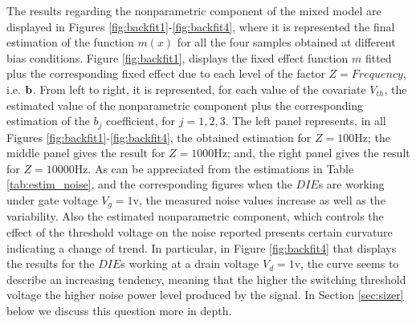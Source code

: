 \documentclass[sn-mathphys]{sn-jnl}%
\theoremstyle{thmstyleone}%
\theoremstyle{thmstyletwo}%
\theoremstyle{thmstylethree}%
\begin{document}
The results regarding the nonparametric component of the mixed model are displayed in Figures \ref{fig:backfit1}-\ref{fig:backfit4}, where it is represented the final estimation of the function $m(x)$ for all the four samples obtained at different bias conditions. Figure \ref{fig:backfit1}, displays the fixed effect function $m$  fitted plus the corresponding fixed effect due to each level of the factor $Z=Frequency$, i.e. ${\bf b}$. From left to right, it is represented, for each value of the covariate $V_{th}$, the estimated value of the nonparametric component plus the corresponding estimation of the $b_j$ coefficient, for $j=1,2, 3$. The left panel represents, in all Figures \ref{fig:backfit1}-\ref{fig:backfit4}, the obtained estimation for $Z=100$Hz; the middle panel gives the result for $Z=1000$Hz; and, the right panel gives the result for $Z=10000$Hz.  As can be appreciated from the estimations in Table \ref{tab:estim_noise}, and the corresponding figures when the $DIE$s are working under gate voltage $V_g=1$v, the measured noise values increase as well as the variability. Also the estimated nonparametric component, which controls the effect of the threshold voltage on the noise reported presents certain curvature indicating a change of trend. In particular, in Figure \ref{fig:backfit4} that displays the results for the $DIE$s working at a drain voltage $V_d=1$v, the curve seems to describe an increasing tendency, meaning that the higher the switching threshold voltage  the higher noise power level produced by the signal. In Section \ref{sec:sizer} below we discuss this question more in depth.
\end{document}
